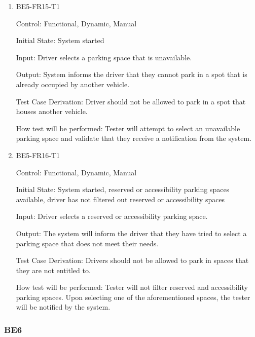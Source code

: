 \documentclass[12pt, titlepage]{article}
\begin{document}
\begin{enumerate}

\item{BE5-FR15-T1}

Control: Functional, Dynamic, Manual
					
Initial State: System started 
					
Input: Driver selects a parking space that is unavailable.
					
Output: System informs the driver that they cannot park in a spot that is
already occupied by another vehicle.

Test Case Derivation: Driver should not be allowed to park in a spot that houses
another vehicle.
					
How test will be performed: Tester will attempt to select an unavailable parking
space and validate that they receive a notification from the system.

\item{BE5-FR16-T1}

Control: Functional, Dynamic, Manual
					
Initial State: System started, reserved or accessibility parking spaces
available, driver has not filtered out reserved or accessibility spaces
					
Input: Driver selects a reserved or accessibility parking space.
					
Output: The system will inform the driver that they have tried to select a
parking space that does not meet their needs. 

Test Case Derivation: Drivers should not be allowed to park in spaces that they
are not entitled to.
					
How test will be performed: Tester will not filter reserved and accessibility
parking spaces. Upon selecting one of the aforementioned spaces, the tester will
be notified by the system.

\end{enumerate}

\subsubsection{BE6}
\end{document}
